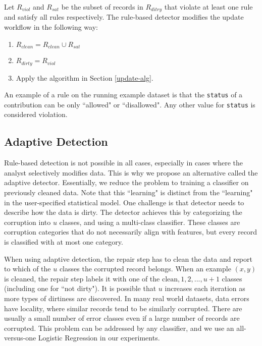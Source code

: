 Let $R_{viol}$ and $R_{sat}$ be the subset of records in $R_{ditry}$ that violate at least one rule and satisfy all rules respectively.
The rule-based detector modifies the update workflow in the following way:
\begin{enumerate}
\item $R_{clean} = R_{clean} \cup R_{sat}$
\item $R_{dirty} = R_{viol}$
\item Apply the algorithm in Section \ref{update-alg}.
\end{enumerate}

\vspace{0.5em}

\begin{example}\label{detex1}
An example of a rule on the running example dataset is that the \texttt{status} of
a contribution can be only ``allowed" or ``disallowed".
Any other value for \texttt{status} is considered violation.
\end{example}

\subsection{Adaptive Detection}
Rule-based detection is not possible in all cases, especially in cases where the analyst selectively modifies data.
This is why we propose an alternative called the adaptive detector.
Essentially, we reduce the problem to training a classifier on previously cleaned data.
Note that this ``learning" is distinct from the ``learning" in the user-specified statistical model.
One challenge is that detector needs to describe how the data is dirty.
The detector achieves this by categorizing the corruption into $u$ classes, and using a multi-class classifier.
These classes are corruption categories that do not necessarily align with features, but every record is classified with at most one category.

When using adaptive detection, the repair step has to clean the data and report to which of the $u$ classes the corrupted record belongs.
When an example $(x,y)$ is cleaned, the repair step labels it with one of the ${\text{clean}, 1,2,...,u+1}$ classes (including one for ``not dirty").
It is possible that $u$ increases each iteration as more types of dirtiness are discovered.
In many real world datasets, data errors have locality, where similar records tend to be similarly corrupted.
There are usually a small number of error classes even if a large number of records are corrupted.
This problem can be addressed by any classifier, and we use an all-versus-one Logistic Regression in our experiments.

